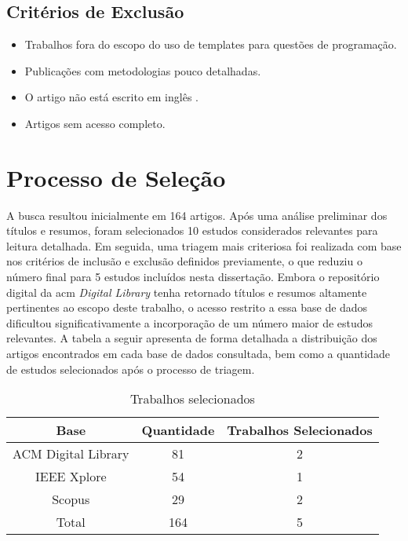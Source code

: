 \subsection{Critérios de Exclusão}
\begin{itemize}
    \item Trabalhos fora do escopo do uso de templates para questões de programação. 
    \item Publicações com metodologias pouco detalhadas. 
    \item O artigo não está escrito em inglês .
    \item Artigos sem acesso completo. 
\end{itemize}

\section{Processo de Seleção}
A busca resultou inicialmente em 164 artigos. Após uma análise preliminar dos títulos e resumos, foram selecionados 10 estudos considerados relevantes para leitura detalhada. Em seguida, uma triagem mais criteriosa foi realizada com base nos critérios de inclusão e exclusão definidos previamente, o que reduziu o número final para 5 estudos incluídos nesta dissertação. Embora o repositório digital da \gls{acm} \textit{Digital Library} tenha retornado títulos e resumos altamente pertinentes ao escopo deste trabalho, o acesso restrito a essa base de dados dificultou significativamente a incorporação de um número maior de estudos relevantes. A tabela a seguir apresenta de forma detalhada a distribuição dos artigos encontrados em cada base de dados consultada, bem como a quantidade de estudos selecionados após o processo de triagem.

\begin{table}[htbp]
    \centering
    \begin{tabular}{|c|c|c|}
        \hline
        Base & Quantidade & Trabalhos Selecionados \\ \hline
        ACM Digital Library & 81 & 2 \\ \hline
        IEEE Xplore & 54 & 1 \\ \hline
        Scopus & 29 & 2 \\ \hline
        Total & 164 & 5 \\ \hline
    \end{tabular}
    \caption{Trabalhos selecionados}
    \label{tab:table-trabalhos-selecionados}
\end{table}


